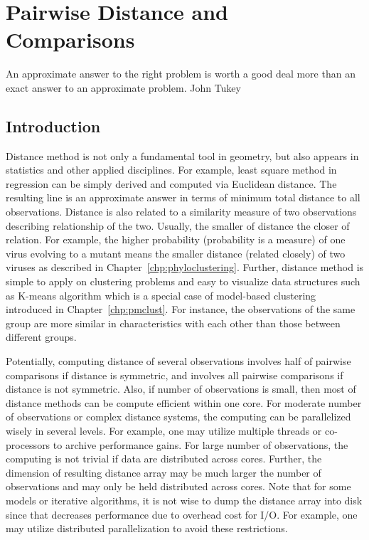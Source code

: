 \chapter{Pairwise Distance and Comparisons}
\label{chp:pairwise}

\inspire%
{An approximate answer to the right problem is worth a good deal more than
an exact answer to an approximate problem.}%
{John Tukey}


\section{Introduction}

Distance method is not only a fundamental tool in geometry, but also appears
in statistics and other applied disciplines. For
example, least square method in regression can be simply derived and computed
via Euclidean distance. The resulting line is an approximate answer
in terms of minimum total distance to all observations. Distance is also
related to a similarity measure of two observations describing
relationship of the two.
Usually, the smaller of distance the closer of relation. For example, the
higher probability (probability is a measure) of
one virus evolving to a mutant means the smaller distance (related closely)
of two viruses as described in Chapter~\ref{chp:phyloclustering}.
Further, distance method is simple to apply on clustering problems
and easy to visualize data structures such as K-means algorithm which is
a special case of model-based clustering
introduced in Chapter~\ref{chp:pmclust}. For instance,
the observations of the same group are more similar in characteristics with
each other than those between different groups.

Potentially, computing distance of several observations involves half of
pairwise comparisons if distance is symmetric, and involves all pairwise
comparisons if distance is not symmetric. Also, if number of observations
is small, then most of distance methods can be compute efficient within
one core. For moderate number of observations or complex distance systems,
the computing can be parallelized wisely in several levels. For example,
one may utilize multiple threads or co-processors
to archive performance gains.
For large number of observations, the computing is not trivial if
data are distributed across cores. Further, the dimension of resulting
distance array may be much larger the number of observations and
may only be held distributed across cores.
Note that for some models or iterative algorithms, it is not wise to dump the
distance array into disk since that decreases performance due to overhead
cost for I/O. For example, one may utilize
distributed parallelization to avoid these restrictions.

